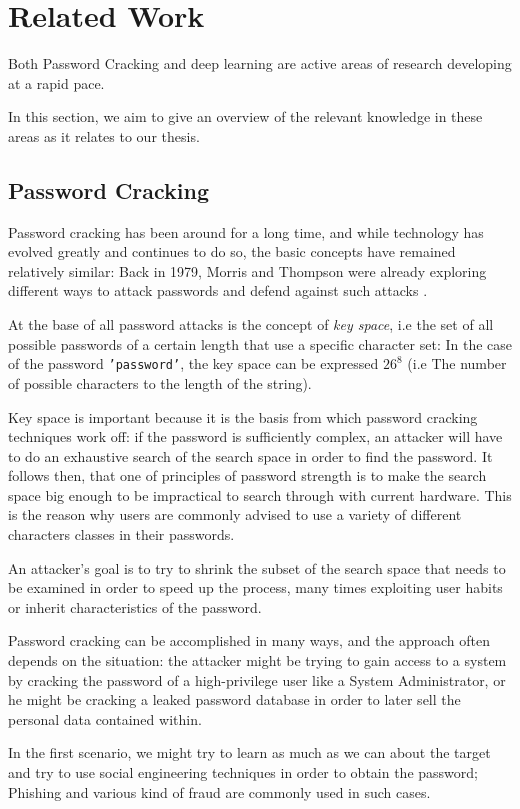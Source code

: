 \section{Related Work}
Both Password Cracking and deep learning are active areas of research developing at a rapid pace.

In this section, we aim to give an overview of the relevant knowledge in these areas as it relates to our thesis.

\subsection{Password Cracking}
Password cracking has been around for a long time, and while technology has evolved greatly and continues to do so, the basic concepts have remained relatively similar:
Back in 1979, Morris and Thompson were already exploring different ways to attack passwords and defend against such attacks \cite{Thompson1979}.

At the base of all password attacks is the concept of \emph{key space}, i.e the set of all possible passwords of a certain length that use a specific character set: In the case of the password \texttt{'password'}, the key space can be expressed $26^8$ (i.e The number of possible characters to the length of the string).

Key space is important because it is the basis from which password cracking techniques work off: if the password is sufficiently complex, an attacker will have to do an exhaustive search of the search space in order to find the password. It follows then, that one of principles of password strength is to make the search space big enough to be impractical to search through with current hardware.
This is the reason why users are commonly advised to use a variety of different characters classes in their passwords.

An attacker's goal is to try to shrink the subset of the search space that needs to be examined in order to speed up the process, many times exploiting user habits or inherit characteristics of the password.

Password cracking can be accomplished in many ways, and the approach often depends on the situation: the attacker might be trying to gain access to a system by cracking the password of a high-privilege user like a System Administrator, or he might be cracking a leaked password database in order to later sell the personal data contained within.

In the first scenario, we might try to learn as much as we can about the target and try to use social engineering techniques in order to obtain the password; Phishing and various kind of fraud are commonly used in such cases.

